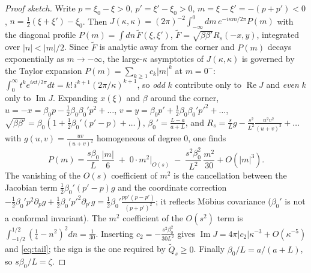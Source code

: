 \documentclass[11pt]{article}
\theoremstyle{accent}
\theoremstyle{definition}
\begin{document}
\begin{proof}[Proof sketch]
Write \(p=\xi_0-\xi>0\), \(p'=\xi'-\xi_0>0\), \(m=\xi-\xi'=-(p+p')<0\), \(n=\tfrac12(\xi+\xi')-\xi_0\).  Then \(J(\kappa,\kappa)=(2\pi)^{-2}\int_{-\infty}^0dm\,e^{-i\kappa m/2\pi}P(m)\) with the diagonal profile \(P(m)=\int dn\,\widetilde F(\xi,\xi')\), \(\widetilde F=\sqrt{\beta\beta'}R_s(-x,y)\), integrated over \(|n|<|m|/2\).  Since \(\widetilde F\) is analytic away from the corner and \(P(m)\) decays exponentially as \(m\to-\infty\), the large-\(\kappa\) asymptotics of \(J(\kappa,\kappa)\) is governed by the Taylor expansion \(P(m)=\sum_{k\ge1}c_k|m|^k\) at \(m=0^-\): \(\int_0^\infty t^ke^{i\kappa t/2\pi}dt=k!\,i^{k+1}(2\pi/\kappa)^{k+1}\), so \emph{odd} \(k\) contribute only to \(\operatorname{Re}J\) and \emph{even} \(k\) only to \(\operatorname{Im}J\).  Expanding \(x(\xi)\) and \(\beta\) around the corner, \(u=-x=\beta_0p-\tfrac12\beta_0\beta_0'p^2+\dots\), \(v=y=\beta_0p'+\tfrac12\beta_0\beta_0'p'^2+\dots\), \(\sqrt{\beta\beta'}=\beta_0(1+\tfrac12\beta_0'(p'-p)+\dots)\), \(\beta_0'=\frac{L-a}{a+L}\), and \(R_s=\frac sL g-\frac{s^2}{L^2}\frac{u^2v^2}{(u+v)^3}+\dots\) with \(g(u,v)=\frac{uv}{(u+v)^2}\) homogeneous of degree \(0\), one finds
\[
 P(m)=\frac{s\beta_0}{L}\,\frac{|m|}{6}\;+\;0\cdot m^2\Big|_{O(s)}\;-\;\frac{s^2\beta_0^2}{L^2}\,\frac{m^2}{30}+O(|m|^3).
\]
The vanishing of the \(O(s)\) coefficient of \(m^2\) is the cancellation between the Jacobian term \(\tfrac12\beta_0'(p'-p)g\) and the coordinate correction \(-\tfrac12\beta_0'p^2\partial_pg+\tfrac12\beta_0'p'^2\partial_{p'}g=\tfrac12\beta_0'\frac{pp'(p-p')}{(p+p')^2}\); it reflects M\"obius covariance (\(\beta_0'\) is not a conformal invariant).  The \(m^2\) coefficient of the \(O(s^2)\) term is \(\int_{-1/2}^{1/2}(\tfrac14-n^2)^2dn=\tfrac1{30}\).  Inserting \(c_2=-\frac{s^2\beta_0^2}{30L^2}\) gives \(\operatorname{Im}J=4\pi|c_2|\kappa^{-3}+O(\kappa^{-5})\) and \eqref{eq:tail}; the sign is the one required by \(\widetilde Q_s\ge0\).  Finally \(\beta_0/L=a/(a+L)\), so \(s\beta_0/L=\zeta\).
\end{proof}
\end{document}
